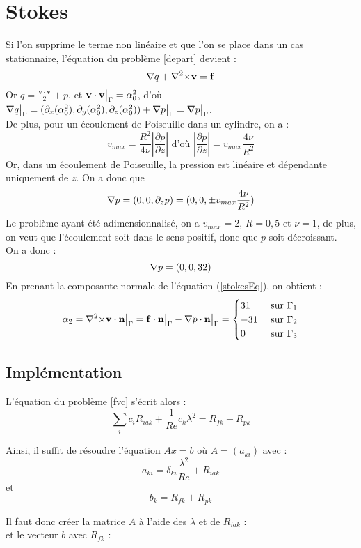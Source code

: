 \section{Stokes}
\label{stokes}
Si l'on supprime le terme non linéaire et que l'on se place dans un cas stationnaire, l'équation du problème \ref{depart} devient :
\begin{equation}\label{stokesEq} {\nabla} q + {\nabla^2\times}\mathbf{v} = \mathbf{f} \end{equation}
Or $q = \frac{\mathbf{v}\cdot\mathbf{v}}{2} + p$, et $\mathbf{v}\cdot\mathbf{v}{\big\rvert_{\Gamma}}=\alpha_0^2$, d'où ${\nabla} q{\big\rvert_{\Gamma}} = (\partial_x(\alpha_0^2), \partial_y(\alpha_0^2), \partial_z(\alpha_0^2)) + {\nabla} p{\big\rvert_{\Gamma}} =  {\nabla} p{\big\rvert_{\Gamma}}$.\\
De plus, pour un écoulement de Poiseuille dans un cylindre, on a : \[ v_{max} = \frac{R^2}{4\nu}\left\lvert\frac{\partial p}{\partial z}\right\rvert \mbox{ d'où } \left\lvert\frac{\partial p}{\partial z}\right\rvert = v_{max}\frac{4\nu}{R^2} \]
Or, dans un écoulement de Poiseuille, la pression est linéaire et dépendante uniquement de $z$. On a donc que \[ {\nabla} p = ( 0, 0, \partial_z p) = (0,0,\pm v_{max}\frac{4\nu}{R^2}) \]
Le problème ayant été adimensionnalisé, on a $v_{max}=2,\, R=0,5\mbox{ et } \nu=1$, de plus, on veut que l'écoulement soit dans le sens positif, donc que $p$ soit décroissant.\\
On a donc :
\[ {\nabla} p = (0,0, 32) \]
En prenant la composante normale de l'équation (\ref{stokesEq}), on obtient :
\[ \alpha_2 = {\nabla^2\times}\mathbf{v}\cdot\mathbf{n}{\big\rvert_{\Gamma}} = \mathbf{f}\cdot\mathbf{n}{\big\rvert_{\Gamma}} - {\nabla} p\cdot\mathbf{n}{\big\rvert_{\Gamma}} = \begin{cases} 31 & \mbox{ sur } \Gamma_1\\ -31 & \mbox{ sur } \Gamma_2\\ 0 & \mbox{ sur }\Gamma_3\end{cases} \]

\subsection{Implémentation}
L'équation du problème \ref{fvc} s'écrit alors :
\[ \sum_i c_iR_{iak} +\frac{1}{Re}c_k\lambda^2 = R_{fk} + R_{pk} \]

Ainsi, il suffit de résoudre l'équation $Ax=b$ où $A=(a_{ki})$ avec :
\[ a_{ki} = \delta_{ki}\frac{\lambda^2}{Re} + R_{iak} \]
et
\[ b_k = R_{fk} + R_{pk} \]

Il faut donc créer la matrice $A$ à l'aide des $\lambda$ et de $R_{iak}$ :\\

et le vecteur $b$ avec $R_{fk}$ :\\


